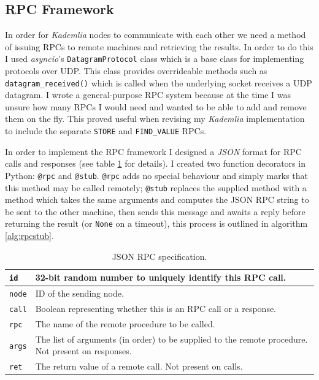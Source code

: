 \documentclass[10pt,twoside,notitlepage,a4paper]{report}
\newcommand{\kademlia}{\emph{Kademlia}}
\begin{document}
	\subsection{RPC Framework}
	\label{sec:rpcframework}
	In order for \kademlia{} nodes to communicate with each other we need a method of issuing RPCs to remote machines and retrieving the results. In order to do this I used \emph{asyncio}'s \texttt{DatagramProtocol} class which is a base class for implementing protocols over UDP. This class provides overrideable methods such as \texttt{datagram\_received()} which is called when the underlying socket receives a UDP datagram. I wrote a general-purpose RPC system because at the time I was unsure how many RPCs I would need and wanted to be able to add and remove them on the fly. This proved useful when revising my \kademlia{} implementation to include the separate \texttt{STORE} and \texttt{FIND\_VALUE} RPCs.
	
	In order to implement the RPC framework I designed a \emph{JSON} format for RPC calls and responses (see table \ref{tab:rpcjson} for details). I created two function decorators in Python: \texttt{@rpc} and \texttt{@stub}. \texttt{@rpc} adds no special behaviour and simply marks that this method may be called remotely; \texttt{@stub} replaces the supplied method with a method which takes the same arguments and computes the JSON RPC string to be sent to the other machine, then sends this message and awaits a reply before returning the result (or \texttt{None} on a timeout), this process is outlined in algorithm \ref{alg:rpcstub}.
	\begin{table}
		\begin{tabularx}{\textwidth}{| l | X |}
			\hline 
			\texttt{id} & 32-bit random number to uniquely identify this RPC call.\\
			\hline
			\texttt{node} & ID of the sending node.\\
			\hline
			\texttt{call} & Boolean representing whether this is an RPC call or a response.\\
			\hline
			\texttt{rpc} & The name of the remote procedure to be called.\\
			\hline
			\texttt{args} & The list of arguments (in order) to be supplied to the remote procedure. Not present on responses.\\
			\hline
			\texttt{ret} & The return value of a remote call. Not present on calls.\\
			\hline
		\end{tabularx}
	\caption{JSON RPC specification.}
	\label{tab:rpcjson}
	\end{table}
\end{document}
